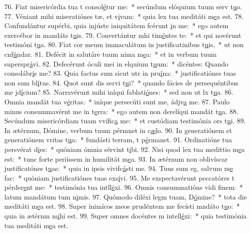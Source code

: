 76. Fiat misericórdia tua t consol\uline{é}tur me:~* secúndum elóquium tuum serv t\uline{u}o.
77. Véniant mihi miseratiónes tæ, et v\uline{i}vam:~* quia lex tua meditáti m\uline{e}a est.
78. Confundántur supérbi, quia injúste iniquitátem fcérunt \uline{i}n me:~* ego autem exercébor in mandáts t\uline{u}is.
79. Convertántur mhi tim\uline{é}ntes te:~* et qui novérunt testimóni t\uline{u}a.
80. Fiat cor meum immaculátum in justificatinibus t\uline{u}is,~* ut non cnf\uline{ú}ndar.
81. Defécit in salutáre tuum nima m\uline{e}a:~* et in verbum tuum superspr\uline{á}vi.
82. Defecérunt óculi mei in elquium t\uline{u}um:~* dicéntes: Quando consolábr\uline{i}s me?
83. Quia factus sum sicut utr in pru\uline{í}na:~* justificatiónes tuas non sum bl\uline{í}tus.
84. Quot sunt dis servi t\uline{u}i?~* quando fácies de persequéntibus me jd\uline{í}cium?
85. Narravérunt mihi iníqui fablati\uline{ó}nes:~* sed non ut lx t\uline{u}a.
86. Omnia mandát tua v\uline{é}ritas:~* iníque persecúti sunt me, ádjv\uline{a} me.
87. Paulo minus consummavérnt me in t\uline{e}rra:~* ego autem non derelíqui mandát t\uline{u}a.
88. Secúndum misericórdiam tuam vvífic\uline{a} me:~* et custódiam testimónia ors t\uline{u}i.
89. In ætérnum, Dómine, verbum tuum pérmnet in c\uline{æ}lo.
90. In generatiónem et generatiónem vritas t\uline{u}a:~* fundásti terram, t p\uline{é}rmanet.
91. Ordinatióne tua persvérat d\uline{i}es:~* quóniam ómnia sérvint t\uline{i}bi.
92. Nisi quod lex tua medittio m\uline{e}a est:~* tunc forte periíssem in humilitát m\uline{e}a.
93. In ætérnum non oblivíscar justificatónes t\uline{u}as:~* quia in ipsis vivifc\uline{á}sti me.
94. Tuus sum eg, salvum m\uline{e} fac:~* quóniam justificatiónes tuas exs\uline{í}vi.
95. Me exspectavérunt peccatóres t pérder\uline{e}nt me:~* testimónia tua intll\uline{é}xi.
96. Omnis consummatións vidi f\uline{i}nem:~* latum mandátum tum n\uline{i}mis.
97. Quómodo diléxi legm tuam, D\uline{ó}mine?~* tota die meditáti m\uline{e}a est.
98. Super inimícos meos prudéntem me fecísti mndáto t\uline{u}o:~* quia in ætérnm m\uline{i}hi est.
99. Super omnes docéntes m intell\uline{é}xi:~* quia testimónia tua meditáti m\uline{e}a est.
